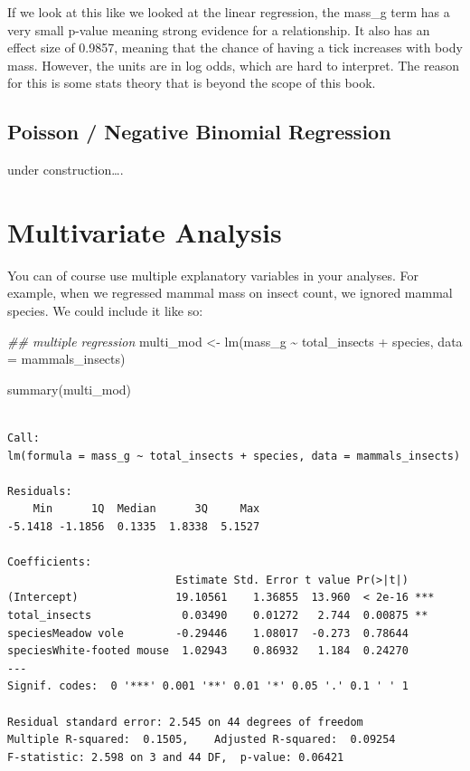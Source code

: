 \documentclass[
  letterpaper,
  DIV=11,
  numbers=noendperiod]{scrreprt}
\newenvironment{Shaded}{\begin{snugshade}}{\end{snugshade}}
\newcommand{\AttributeTok}[1]{\textcolor[rgb]{0.40,0.45,0.13}{#1}}
\newcommand{\DocumentationTok}[1]{\textcolor[rgb]{0.37,0.37,0.37}{\textit{#1}}}
\newcommand{\FunctionTok}[1]{\textcolor[rgb]{0.28,0.35,0.67}{#1}}
\newcommand{\NormalTok}[1]{\textcolor[rgb]{0.00,0.23,0.31}{#1}}
\newcommand{\OtherTok}[1]{\textcolor[rgb]{0.00,0.23,0.31}{#1}}
\newcommand{\SpecialCharTok}[1]{\textcolor[rgb]{0.37,0.37,0.37}{#1}}
\begin{document}
If we look at this like we looked at the linear regression, the mass\_g
term has a very small p-value meaning strong evidence for a
relationship. It also has an effect size of 0.9857, meaning that the
chance of having a tick increases with body mass. However, the units are
in log odds, which are hard to interpret. The reason for this is some
stats theory that is beyond the scope of this book.

\hypertarget{poisson-negative-binomial-regression}{%
\subsection{Poisson / Negative Binomial
Regression}\label{poisson-negative-binomial-regression}}

under construction\ldots.

\hypertarget{multivariate-analysis}{%
\section{Multivariate Analysis}\label{multivariate-analysis}}

You can of course use multiple explanatory variables in your analyses.
For example, when we regressed mammal mass on insect count, we ignored
mammal species. We could include it like so:

\begin{Shaded}
\begin{Highlighting}[]
\DocumentationTok{\#\# multiple regression}
\NormalTok{multi\_mod }\OtherTok{\textless{}{-}} \FunctionTok{lm}\NormalTok{(mass\_g }\SpecialCharTok{\textasciitilde{}}\NormalTok{ total\_insects }\SpecialCharTok{+}\NormalTok{ species, }\AttributeTok{data =}\NormalTok{ mammals\_insects)}

\FunctionTok{summary}\NormalTok{(multi\_mod)}
\end{Highlighting}
\end{Shaded}

\begin{verbatim}

Call:
lm(formula = mass_g ~ total_insects + species, data = mammals_insects)

Residuals:
    Min      1Q  Median      3Q     Max 
-5.1418 -1.1856  0.1335  1.8338  5.1527 

Coefficients:
                          Estimate Std. Error t value Pr(>|t|)    
(Intercept)               19.10561    1.36855  13.960  < 2e-16 ***
total_insects              0.03490    0.01272   2.744  0.00875 ** 
speciesMeadow vole        -0.29446    1.08017  -0.273  0.78644    
speciesWhite-footed mouse  1.02943    0.86932   1.184  0.24270    
---
Signif. codes:  0 '***' 0.001 '**' 0.01 '*' 0.05 '.' 0.1 ' ' 1

Residual standard error: 2.545 on 44 degrees of freedom
Multiple R-squared:  0.1505,    Adjusted R-squared:  0.09254 
F-statistic: 2.598 on 3 and 44 DF,  p-value: 0.06421
\end{verbatim}
\end{document}
